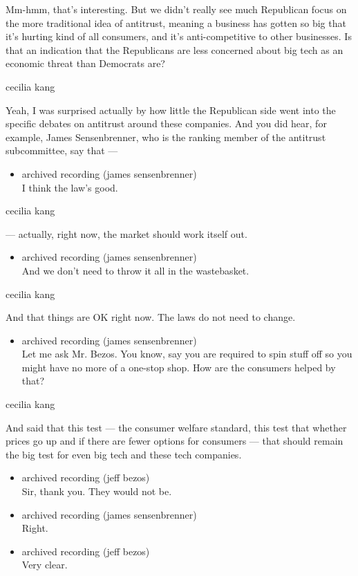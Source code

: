 Mm-hmm, that's interesting. But we didn't really see much Republican
focus on the more traditional idea of antitrust, meaning a business has
gotten so big that it's hurting kind of all consumers, and it's
anti-competitive to other businesses. Is that an indication that the
Republicans are less concerned about big tech as an economic threat than
Democrats are?

cecilia kang

Yeah, I was surprised actually by how little the Republican side went
into the specific debates on antitrust around these companies. And you
did hear, for example, James Sensenbrenner, who is the ranking member of
the antitrust subcommittee, say that ---

\begin{itemize}
\tightlist
\item
  archived recording (james sensenbrenner)\\
  I think the law's good.
\end{itemize}

cecilia kang

--- actually, right now, the market should work itself out.

\begin{itemize}
\tightlist
\item
  archived recording (james sensenbrenner)\\
  And we don't need to throw it all in the wastebasket.
\end{itemize}

cecilia kang

And that things are OK right now. The laws do not need to change.

\begin{itemize}
\tightlist
\item
  archived recording (james sensenbrenner)\\
  Let me ask Mr. Bezos. You know, say you are required to spin stuff off
  so you might have no more of a one-stop shop. How are the consumers
  helped by that?
\end{itemize}

cecilia kang

And said that this test --- the consumer welfare standard, this test
that whether prices go up and if there are fewer options for consumers
--- that should remain the big test for even big tech and these tech
companies.

\begin{itemize}
\item
  archived recording (jeff bezos)\\
  Sir, thank you. They would not be.
\item
  archived recording (james sensenbrenner)\\
  Right.
\item
  archived recording (jeff bezos)\\
  Very clear.
\end{itemize}

